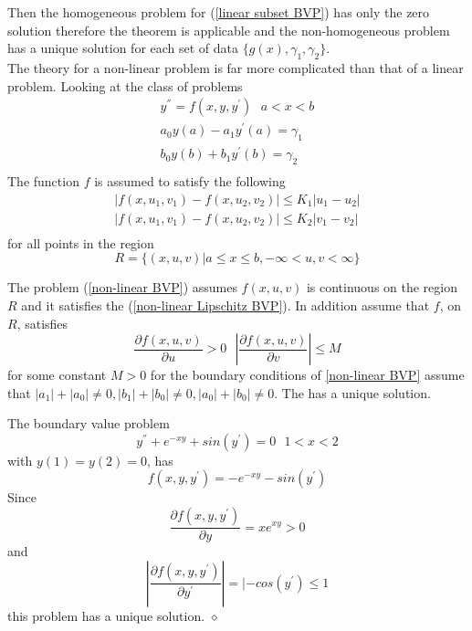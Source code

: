 Then the homogeneous problem for (\ref{linear subset BVP}) has only the zero solution
therefore the theorem is applicable and the non-homogeneous problem has a unique
solution for each set of data $\{g(x),\gamma_1,\gamma_2 \}$.\\
The theory for a non-linear problem is far more complicated than that of a linear problem. Looking at the class of problems
\begin{equation}\label{non-linear BVP}
\begin{array}{l}
y^{''}=f(x,y,y^{'}) \ \ \ a < x < b \\
a_0 y(a)-a_1  y^{'}(a) =\gamma_1 \\
 b_0y(b) +b_1 y^{'}(b) = \gamma_2 \\
\end{array}
\end{equation}
The function $f$ is assumed to satisfy the following 
\begin{equation}\label{non-linear Lipschitz BVP}
\begin{array}{l}
|f(x,u_1,v_1)-f(x,u_2,v_2)| \leq K_1|u_1-u_2|\\
|f(x,u_1,v_1)-f(x,u_2,v_2)| \leq K_2|v_1-v_2|\\
\end{array}
\end{equation}
for all points in the region
\[ R=\{(x,u,v)| a\leq x \leq b, -\infty < u,v < \infty \}\]
\begin{theorem}
The problem (\ref{non-linear BVP}) assumes $f(x,u,v)$ is continuous on the region
$R$ and it satisfies the  (\ref{non-linear Lipschitz  BVP}).  In
addition assume that $f$, on $R$, satisfies
\[\frac{\partial f(x,u,v)}{\partial u}> 0 \ \ \ \left|\frac{\partial f(x,u,v)}{\partial v} \right|\leq M \]
for some constant $M>0$ for the boundary conditions of \ref{non-linear BVP} assume
that $|a_1|+|a_0|\not= 0, |b_1|+|b_0|\not= 0,|a_0|+|b_0|\not= 0$.
The  has a unique solution.
\end{theorem}
\begin{example}
The boundary value problem 
\[ y^{''} +e^{-xy}+sin(y^{'})=0 \ \ \ 1 < x < 2\]
with $y(1)=y(2)=0$, has
\[ f(x,y,y^{'})=-e^{-xy}-sin(y^{'})\]
Since 
\[\frac{\partial f(x,y,y^{'})}{\partial y} =xe^{xy} >0 \]
and
\[\left|\frac{\partial f(x,y,y^{'})}{\partial y^{'}}\right| =|-cos(y^{'}) \leq1 \]
this problem has a unique solution.
$\diamond$
\end{example}
